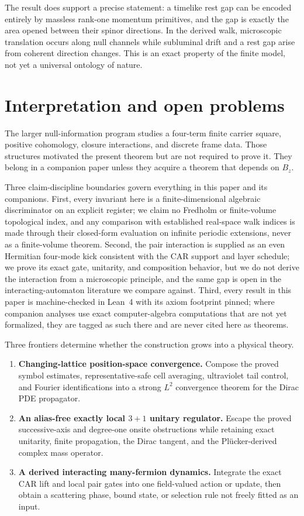 \documentclass[11pt]{article}
\begin{document}
The result does support a precise statement: a timelike rest gap can be encoded
entirely by massless rank-one momentum primitives, and the gap is exactly the
area opened between their spinor directions.  In the derived walk, microscopic
translation occurs along null channels while subluminal drift and a rest gap
arise from coherent direction changes.  This is an exact property of the
finite model, not yet a universal ontology of nature.

\section{Interpretation and open problems}

The larger null-information program studies a four-term finite carrier square,
positive cohomology, closure interactions, and discrete frame data.  Those
structures motivated the present theorem but are not required to prove it.
They belong in a companion paper unless they acquire a theorem that depends on
$B_z$.

Three claim-discipline boundaries govern everything in this paper and its
companions.  First, every invariant here is a finite-dimensional algebraic
discriminator on an explicit register; we claim no Fredholm or
finite-volume topological index, and any comparison with established
real-space walk indices is made through their closed-form evaluation on
infinite periodic extensions, never as a finite-volume theorem.  Second,
the pair interaction is supplied as an even Hermitian four-mode kick
consistent with the CAR support and layer schedule; we prove its exact
gate, unitarity, and composition behavior, but we do not derive the
interaction from a microscopic principle, and the same gap is open in the
interacting-automaton literature we compare against.  Third, every result
in this paper is machine-checked in Lean~4 with its axiom footprint
pinned; where companion analyses use exact computer-algebra computations
that are not yet formalized, they are tagged as such there and are never
cited here as theorems.

Three frontiers determine whether the construction grows into a physical
theory.
\begin{enumerate}[leftmargin=2em]
  \item \textbf{Changing-lattice position-space convergence.}  Compose the
  proved symbol estimates, representative-safe cell averaging, ultraviolet
  tail control, and Fourier identifications into a strong $L^2$ convergence
  theorem for the Dirac PDE propagator.
  \item \textbf{An alias-free exactly local $3+1$ unitary regulator.}  Escape
  the proved successive-axis and degree-one onsite obstructions while retaining
  exact unitarity, finite propagation, the Dirac tangent, and the
  Pl\"ucker-derived complex mass operator.
  \item \textbf{A derived interacting many-fermion dynamics.}  Integrate the
  exact CAR lift and local pair gates into one field-valued action or update,
  then obtain a scattering phase, bound state, or selection rule not freely
  fitted as an input.
\end{enumerate}
\end{document}
